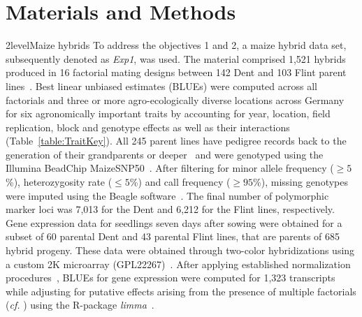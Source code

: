 \documentclass[12pt,titlepage]{article}
\begin{document}
\section{Materials and Methods}
\Genetics2level{Maize hybrids}
To address the objectives 1 and 2, a maize hybrid data set, subsequently
denoted as \textit{Exp1}, was used.
The material comprised 1,521 hybrids produced in 16 factorial mating designs
between 142 Dent and 103 Flint parent lines~\cite{Westhues2017}. 
Best linear unbiased estimates (BLUEs) were computed across all factorials and 
three or more agro-ecologically diverse locations across Germany for six 
agronomically important traits by accounting for year, location, field 
replication, block and genotype effects as well as their interactions
(Table~\ref{table:TraitKey}).
All 245 parent lines have pedigree records back to the generation of their 
grandparents or deeper~\cite{Westhues2017} and were genotyped using the Illumina 
BeadChip MaizeSNP50~\cite{Ganal2011}.
After filtering for minor allele frequency ($\geq 5$\%), heterozygosity rate
($\leq 5$\%) and call frequency ($\geq 95$\%), missing genotypes were imputed 
using the Beagle software~\cite{Browning2009}.
The final number of polymorphic marker loci was 7,013 for the Dent and 6,212 for 
the Flint lines, respectively.
Gene expression data for seedlings seven days after sowing were obtained for a 
subset of 60 parental Dent and 43 parental Flint lines, that are parents of 685
hybrid progeny.
These data were obtained through two-color hybridizations using a custom 2K 
microarray (GPL22267)~\cite{Westhues2017}.
After applying established normalization procedures~\cite{Smyth2003,Ritchie2007},
BLUEs for gene expression were computed for 1,323 transcripts while adjusting
for putative effects arising from the presence of multiple factorials
(\textit{cf.} ) using the R-package
\textit{limma}~\cite{Ritchie2015a}.
\end{document}
